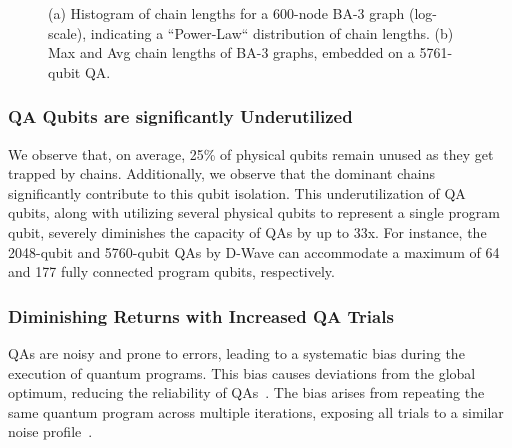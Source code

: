 \begin{figure}[h]
    \captionsetup[subfigure]{position=top} %
    \centering
    \caption{  
(a) Histogram of chain lengths for a 600-node BA-3 graph (log-scale), indicating a ``Power-Law`` distribution of chain lengths.
 (b) Max and Avg chain lengths of BA-3 graphs, embedded on a 5761-qubit QA.
    }
    \label{fig:not_equal_qubits} 
\end{figure}  


\subsubsection{QA Qubits are significantly Underutilized}

We observe that, on average, 25\% of physical qubits remain unused as they get trapped by chains.  
Additionally, we observe that the dominant chains significantly contribute to this qubit isolation.
This underutilization of QA qubits, along with utilizing several physical qubits to represent a single program qubit, severely diminishes the capacity of QAs by up to 33x.
For instance, the 2048-qubit and 5760-qubit QAs by D-Wave can accommodate a maximum of 64 and 177 fully connected program qubits, respectively.





\subsubsection{Diminishing Returns with Increased QA Trials}

QAs are noisy and prone to errors, leading to a systematic bias during the execution of quantum programs.
This bias causes deviations from the global optimum, reducing the reliability of QAs~\cite{albash2018adiabatic,mcgeoch2020theory,ayanzadeh2022equal,ayanzadeh2021multi}.
The bias arises from repeating the same quantum program across multiple iterations, exposing all trials to a similar noise profile~\cite{ayanzadeh2022equal}. 

